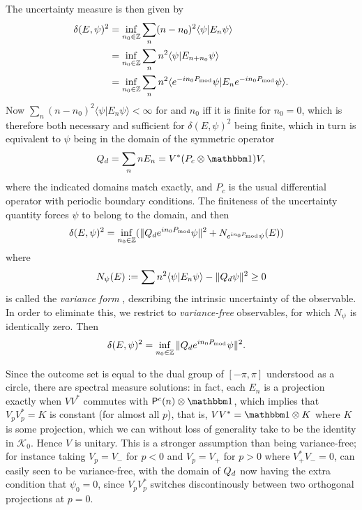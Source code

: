The uncertainty measure is then given by
\begin{align*}
\delta(E,\psi)^2 &= \inf_{n_0\in \mathbb Z} \sum_n (n-n_0)^2 \langle \psi|E_n\psi\rangle \\
&= \inf_{n_0\in \mathbb Z} \sum_n n^2 \langle \psi|E_{n+n_0}\psi\rangle\\
& = \inf_{n_0\in \mathbb Z} \sum_n n^2 \langle e^{-in_0P_{\mathrm{mod}}}\psi|E_{n}e^{-in_0P_{\mathrm{mod}}}\psi\rangle.
\end{align*}
Now $\sum_n (n-n_0)^2 \langle \psi|E_n\psi\rangle<\infty$ for and $n_0$ iff it is finite for $n_0=0$, which is therefore both necessary and sufficient for $\delta(E,\psi)^2$ being finite, which in turn is equivalent to $\psi$ being in the domain of the symmetric operator
$$
\Qd = \sum_n n E_n = V^* (P_c\otimes \id) V,
$$
where the indicated domains match exactly, and $P_c$ is the usual differential operator with periodic boundary conditions. The finiteness of the uncertainty quantity forces $\psi$ to belong to the domain, and then
\begin{align*}
\delta(E,\psi)^2 &= \inf_{n_0\in \mathbb Z}(\|Q_d e^{in_0P_{\mathrm{mod}}}\psi\|^2 + N_{e^{in_0P_{\mathrm{mod}}}\psi}(E))
\end{align*}
where $$N_\psi(E) := \sum n^2 \langle \psi |E_n\psi\rangle - \|Q_d\psi\|^2\geq 0$$ is called the \emph{variance form} \cites{werner-screen-obs}{akhiezer-glazman-lin-ops-hilb-space}{WOJCIK2015531}, describing the intrinsic uncertainty of the observable. In order to eliminate this, we restrict to \emph{variance-free} observables, for which $N_\psi$ is identically zero. Then 
\begin{align*}
\delta(E,\psi)^2 &= \inf_{n_0\in \mathbb Z} \|Q_d e^{in_0P_{\mathrm{mod}}}\psi\|^2.
\end{align*}

Since the outcome set is equal to the dual group of $[-\pi,\pi]$ understood as a circle, there are spectral measure solutions: in fact, each $E_n$ is a projection exactly when $VV^*$ commutes with $\Pc(n)\otimes \id$, which implies that $V_pV_p^* = K$ is constant (for almost all $p$), that is, $VV^* =\id \otimes K$ where $K$ is some projection, which we can without loss of generality take to be the identity in $\mathcal K_0$. Hence $V$ is unitary. This is a stronger assumption than being variance-free; for instance taking $V_p=V_-$ for $p<0$ and $V_p=V_+$ for $p>0$ where $V_+^*V_-=0$, can easily seen to be variance-free, with the domain of $Q_d$ now having the extra condition that $\psi_0=0$, since $V_pV_p^*$ switches discontinously between two orthogonal projections at $p=0$.

